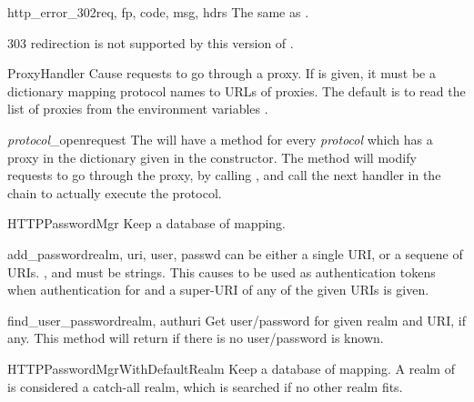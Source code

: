 \begin{methoddesc}[HTTPRedirectHandler]{http_error_302}{req, fp, code, 
                                                        msg, hdrs}
The same as .
\end{methoddesc}

 303 redirection is not supported by this version of 
.

\begin{classdesc}{ProxyHandler}{}
Cause requests to go through a proxy.
If  is given, it must be a dictionary mapping
protocol names to URLs of proxies.
The default is to read the list of proxies from the environment
variables .
\end{classdesc}

\begin{methoddesc}[ProxyHandler]{{\em protocol}_open}{request}
The  will have a method  for
every {\em protocol} which has a proxy in the  dictionary
given in the constructor. The method will modify requests to go
through the proxy, by calling , and call the next 
handler in the chain to actually execute the protocol.
\end{methoddesc}

\begin{classdesc}{HTTPPasswordMgr}{}
Keep a database of 
 mapping.
\end{classdesc}

\begin{methoddesc}[HTTPPasswordMgr]{add_password}{realm, uri, user, passwd}
 can be either a single URI, or a sequene of URIs. ,
 and  must be strings. This causes
  to be used as authentication tokens
when authentication for  and a super-URI of any of the
given URIs is given.
\end{methoddesc}  

\begin{methoddesc}[HTTPPasswordMgr]{find_user_password}{realm, authuri}
Get user/password for given realm and URI, if any. This method will
return  if there is no user/password is known.
\end{methoddesc}

\begin{classdesc}{HTTPPasswordMgrWithDefaultRealm}{}
Keep a database of 
 mapping.
A realm of  is considered a catch-all realm, which is searched
if no other realm fits.
\end{classdesc}

